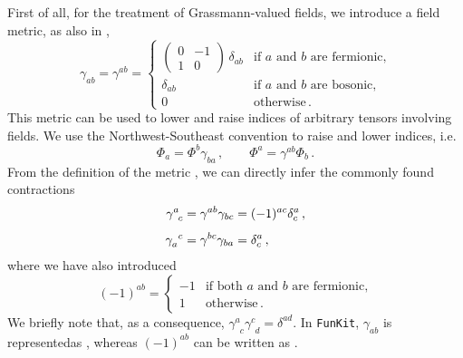 \documentclass[10pt,prd,nofootinbib,superscriptaddress,twocolumn]{revtex4-2}
\newcommand{\FunKit}{\texttt{FunKit}\xspace}
\begin{document}
First of all, for the treatment of Grassmann-valued fields, we introduce a field metric, as also in \cite{Pawlowski:2005xe, Braun:2025gvq},
%
\begin{equation}\label{eq:metric}
	\gamma_{ab} = \gamma^{ab} = \begin{cases}
		\begin{pmatrix}
			0 & -1 \\
			1 & 0
		\end{pmatrix}\,\delta_{ab}
		& \text{if $a$ and $b$ are fermionic,} \\[3ex]
		\delta_{ab} & \text{if $a$ and $b$ are bosonic,}   \\[2ex]
		0               & \text{otherwise} 
		\,.
	\end{cases}
\end{equation}
%
This metric can be used to lower and raise indices of arbitrary tensors involving fields. We use the Northwest-Southeast convention to raise and lower indices, i.e.
%
\begin{equation}
	\Phi_a = \Phi^b\gamma_{ba} \,,
	\quad \quad
	\Phi^a = \gamma^{ab}\Phi_b \,.
\end{equation}
%
From the definition of the metric , we can directly infer the commonly found contractions
%
\begin{align}
	\gamma^{a}_{\phantom{a}c} &= \gamma^{ab}\gamma_{bc} = (-1)^{ac}\delta^a_c
	\,,\notag\\[1ex]
	\gamma_{a}^{\phantom{a}c} &= \gamma^{bc}\gamma_{ba} = \delta^a_c
	\,,
\end{align}
%
where we have also introduced
%
\begin{equation}
	(-1)^{ab} = \begin{cases}
		-1 & \text{if both $a$ and $b$ are fermionic,} \\[1ex]
		1 & \text{otherwise} 
		\,.
	\end{cases}
\end{equation}
%
We briefly note that, as a consequence, $\gamma^{a}_{\phantom{a}c}\gamma^{c}_{\phantom{c}d} = \delta^{ad}$.
In \FunKit, $\gamma_{ab}$ is represented\linebreak as , whereas $(-1)^{ab}$ can be written as .
\end{document}
